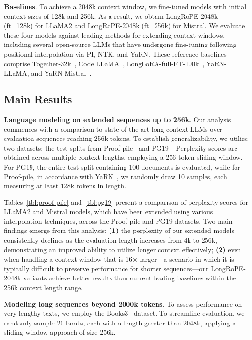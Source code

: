 \textbf{Baselines}. To achieve a 2048k context window, we fine-tuned models with initial context sizes of 128k and 256k. As a result, we obtain LongRoPE-2048k (ft=128k) for LLaMA2 and LongRoPE-2048k (ft=256k) for Mistral. We evaluate these four models against leading methods for extending context windows, including several open-source LLMs that have undergone fine-tuning following positional interpolation via PI, NTK, and YaRN. These reference baselines comprise Together-32k~\cite{together}, Code LLaMA~\cite{codellama}, LongLoRA-full-FT-100k~\cite{longlora}, YaRN-LLaMA, and YaRN-Mistral~\cite{yarn}.

\subsection{Main Results}

\label{sec:mainresult}
\textbf{Language modeling on extended sequences up to 256k.} Our analysis commences with a comparison to state-of-the-art long-context LLMs over evaluation sequences reaching 256k tokens. To establish generalizability, we utilize two datasets: the test splits from Proof-pile~\cite{pg19} and PG19~\cite{pile}. Perplexity scores are obtained across multiple context lengths, employing a 256-token sliding window. For PG19, the entire test split containing 100 documents is evaluated, while for Proof-pile, in accordance with YaRN~\cite{yarn}, we randomly draw 10 samples, each measuring at least 128k tokens in length.

Tables~\ref{tbl:proof-pile} and~\ref{tbl:pg19} present a comparison of perplexity scores for LLaMA2 and Mistral models, which have been extended using various interpolation techniques, across the Proof-pile and PG19 datasets. Two main findings emerge from this analysis: \textbf{(1)} the perplexity of our extended models consistently declines as the evaluation length increases from 4k to 256k, demonstrating an improved ability to utilize longer context effectively; \textbf{(2)} even when handling a context window that is 16$\times$ larger—a scenario in which it is typically difficult to preserve performance for shorter sequences—our LongRoPE-2048k variants achieve better results than current leading baselines within the 256k context length range.

\textbf{Modeling long sequences beyond 2000k tokens}. To assess performance on very lengthy texts, we employ the Books3~\cite{pile} dataset. To streamline evaluation, we randomly sample 20 books, each with a length greater than 2048k, applying a sliding window approach of size 256k.

